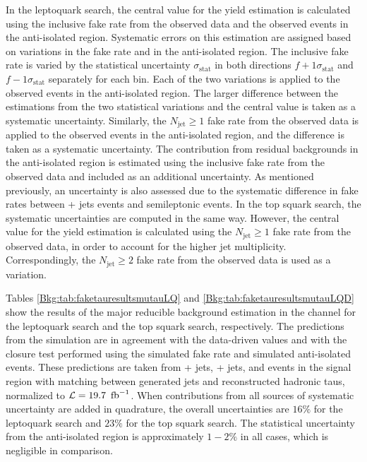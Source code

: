 In the leptoquark search, the central value for the yield estimation is calculated using the inclusive fake rate from the observed data and the observed events in the anti-isolated region. Systematic errors on this estimation are assigned based on variations in the fake rate and in the anti-isolated region. The inclusive fake rate is varied by the statistical uncertainty $\sigma_{\text{stat}}$ in both directions $f+1\sigma_{\text{stat}}$ and $f-1\sigma_{\text{stat}}$ separately for each bin. Each of the two variations is applied to the observed events in the anti-isolated region. The larger difference between the estimations from the two statistical variations and the central value is taken as a systematic uncertainty. Similarly, the $N_{\text{jet}} \geq 1$ fake rate from the observed data is applied to the observed events in the anti-isolated region, and the difference is taken as a systematic uncertainty. The contribution from residual backgrounds in the anti-isolated region is estimated using the inclusive fake rate from the observed data and included as an additional uncertainty. As mentioned previously, an uncertainty is also assessed due to the systematic difference in fake rates between \Zmm + jets events and semileptonic \ttbar events. In the top squark search, the systematic uncertainties are computed in the same way. However, the central value for the yield estimation is calculated using the $N_{\text{jet}} \geq 1$ fake rate from the observed data, in order to account for the higher jet multiplicity. Correspondingly, the $N_{\text{jet}} \geq 2$ fake rate from the observed data is used as a variation.

Tables \ref{Bkg:tab:faketauresultsmutauLQ} and \ref{Bkg:tab:faketauresultsmutauLQD} show the results of the major reducible background estimation in the \mutau channel for the leptoquark search and the top squark search, respectively. The predictions from the simulation are in agreement with the data-driven values and with the closure test performed using the simulated fake rate and simulated anti-isolated events. These predictions are taken from \W + jets, \Z + jets, and \ttbar events in the signal region with matching between generated jets and reconstructed hadronic taus, normalized to $\mathcal{L} = 19.7~\mbox{\ensuremath{\,\text{fb}^\text{$-$1}}}$. When contributions from all sources of systematic uncertainty are added in quadrature, the overall uncertainties are $16\%$ for the leptoquark search and $23\%$ for the top squark search. The statistical uncertainty from the anti-isolated region is approximately $1-2\%$ in all cases, which is negligible in comparison.

